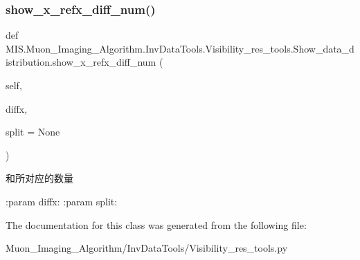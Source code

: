 \subsubsection{\texorpdfstring{show\+\_\+x\+\_\+refx\+\_\+diff\+\_\+num()}{show\_x\_refx\_diff\_num()}}
{\footnotesize\ttfamily def M\+I\+S.\+Muon\+\_\+\+Imaging\+\_\+\+Algorithm.\+Inv\+Data\+Tools.\+Visibility\+\_\+res\+\_\+tools.\+Show\+\_\+data\+\_\+distribution.\+show\+\_\+x\+\_\+refx\+\_\+diff\+\_\+num (\begin{DoxyParamCaption}\item[{}]{self,  }\item[{}]{diffx,  }\item[{}]{split = {\ttfamily None} }\end{DoxyParamCaption})}

\begin{DoxyVerb}[计算值与参考值的差]和所对应的数量

:param diffx:
:param split:
\end{DoxyVerb}
 

The documentation for this class was generated from the following file\+:\begin{DoxyCompactItemize}
\item 
Muon\+\_\+\+Imaging\+\_\+\+Algorithm/\+Inv\+Data\+Tools/Visibility\+\_\+res\+\_\+tools.\+py\end{DoxyCompactItemize}
